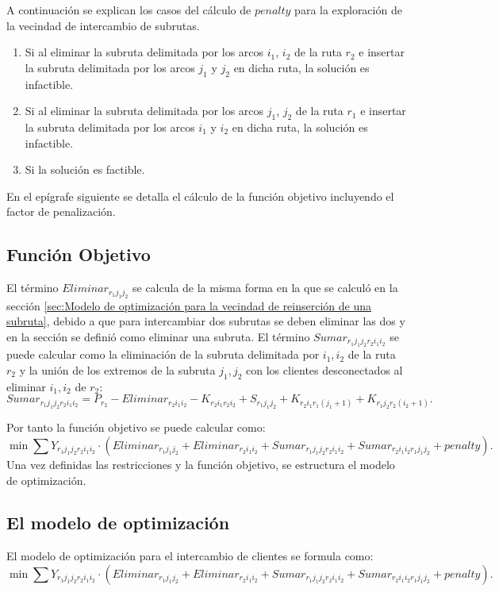 \documentclass[12pt]{report}
\begin{document}
	A continuación se explican los casos del cálculo de $penalty$ para la exploración de la vecindad de intercambio de subrutas.
	\begin{enumerate}
		\item Si al eliminar la subruta delimitada por los arcos $i_1$, $i_2$ de la ruta $r_2$ e insertar la subruta delimitada por los arcos $j_1$ y $j_2$ en dicha ruta, la solución es infactible.
		\item Si al eliminar la subruta delimitada por los arcos $j_1$, $j_2$ de la ruta $r_1$ e insertar la subruta delimitada por los arcos $i_1$ y $i_2$ en dicha ruta, la solución es infactible.
		\item Si la solución es factible.
	\end{enumerate}

	En el epígrafe siguiente se detalla el cálculo de la función objetivo incluyendo el factor de penalización.

	\subsection{Función Objetivo}
    El término $Eliminar_{r_1j_1j_2}$ se calcula de la misma forma en la que se calculó en la sección \ref{sec:Modelo de optimización para la vecindad de reinserción de una subruta}, debido a que para intercambiar dos subrutas se deben eliminar las dos y en la sección se definió como eliminar una subruta. El término $Sumar_{r_1j_1j_2r_2i_1i_2}$ se puede calcular como la eliminación de la subruta delimitada por $i_1,i_2$ de la ruta $r_2$ y la unión de los extremos de la subruta $j_1,j_2$ con los clientes desconectados al eliminar $i_1,i_2$ de $r_2$:
    \[
    Sumar_{r_1j_1j_2r_2i_1i_2}= P_{r_2} - Eliminar_{r_2i_1i_2}-K_{{r_2}{i_1}{r_2}{i_2}}+S_{{r_1}{j_1}{j_2}}+K_{{r_2}{i_1}{r_1}{(j_1+1)}} + K_{{r_1}{j_2}{r_2}{(i_2+1)}}.
    \]

    Por tanto la función objetivo se puede calcular como:
    \[
    \min \sum Y_{r_1j_1j_2r_2i_1i_2} \cdot (Eliminar_{r_1j_1j_2} + Eliminar_{r_2i_1i_2} + Sumar_{r_1j_1j_2r_2i_1i_2} +Sumar_{r_2i_1i_2r_1j_1j_2} + penalty).
    \]
    Una vez definidas las restricciones y la función objetivo, se estructura el modelo de optimización.
	\subsection{El modelo de optimización}

	El modelo de optimización para el intercambio de clientes se formula como:
	\[
	\min \sum Y_{r_1j_1j_2r_2i_1i_2} \cdot (Eliminar_{r_1j_1j_2} + Eliminar_{r_2i_1i_2} + Sumar_{r_1j_1j_2r_2i_1i_2} +Sumar_{r_2i_1i_2r_1j_1j_2} + penalty).
    \]
\end{document}
